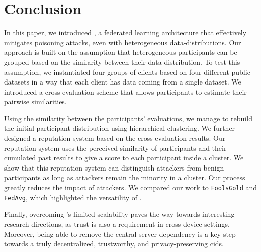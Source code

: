 \section{Conclusion}\label{sec:conclu}
In this paper, we introduced \thecontrib, a federated learning architecture that effectively mitigates poisoning attacks, even with heterogeneous data-distributions.
Our approach is built on the assumption that heterogeneous participants can be grouped based on the similarity between their data distribution.
To test this assumption, we instantiated four groups of clients based on four different public datasets in a way that each client has data coming from a single dataset. 
We introduced a cross-evaluation scheme that allows participants to estimate their pairwise similarities. 

Using the similarity between the participants' evaluations, we manage to rebuild the initial participant distribution using hierarchical clustering. 
We further designed a reputation system based on the cross-evaluation results.
Our reputation system uses the perceived similarity of participants and their cumulated past results to give a score to each participant inside a cluster.     
We show that this reputation system can distinguish attackers from benign participants as long as attackers remain the minority in a cluster. 
Our process greatly reduces the impact of attackers. 
We compared our work to \texttt{FoolsGold} and \texttt{FedAvg}, which highlighted the versatility of \thecontrib.
%
%
%

Finally, overcoming \thecontrib's limited scalability paves the way towards interesting research directions, as trust is also a requirement in cross-device settings.
Moreover, being able to remove the central server dependency is a key step towards a truly decentralized, trustworthy, and privacy-preserving \gls{cids}.